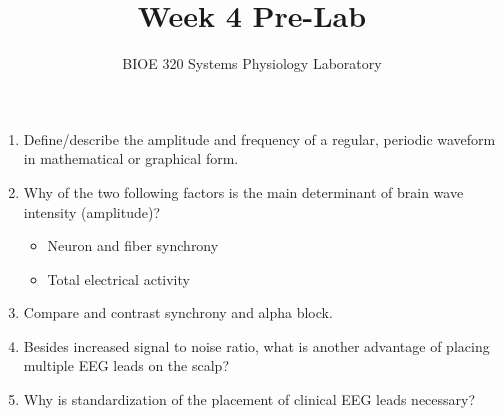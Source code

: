 \documentclass{article}
\title{Week 4 Pre-Lab}
\author{BIOE 320 Systems Physiology Laboratory}
\date{}
\begin{document}
\maketitle
\large

\begin{enumerate}
	\item Define/describe the amplitude and frequency of a regular, periodic waveform in mathematical or graphical form.
	\item Why of the two following factors is the main determinant of brain wave intensity (amplitude)?
	\begin{itemize}
		\item Neuron and fiber synchrony
		\item Total electrical activity
	\end{itemize}
	
	\item Compare and contrast synchrony and alpha block.
	\item Besides increased signal to noise ratio, what is another advantage of placing multiple EEG leads on the scalp?
	\item Why is standardization of the placement of clinical EEG leads necessary?
\end{enumerate}
\end{document}
